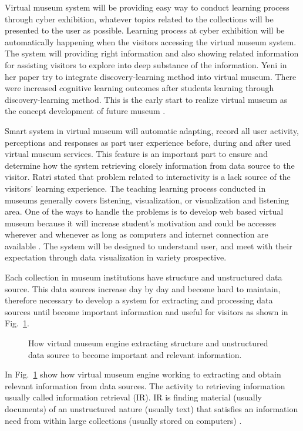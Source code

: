 Virtual museum system will be providing easy way to conduct learning process through cyber exhibition, whatever topics related to the collections will be presented to the user as possible. Learning process at cyber exhibition will be automatically happening when the visitors accessing the virtual museum system. The system will providing right information and also showing related information for assisting visitors to explore into deep substance of the information. Yeni in her paper try to integrate discovery-learning method into virtual museum. There were increased cognitive learning outcomes after students learning through discovery-learning method. This is the early start to realize virtual museum as the concept development of future museum \cite{Nurhasanah}.

Smart system in virtual museum will automatic adapting, record all user activity, perceptions and responses as part user experience before, during and after used virtual museum services. This feature is an important part to ensure and determine how the system retrieving closely information from data source to the visitor. Ratri stated that problem related to interactivity is a lack source of the visitors' learning experience. The teaching learning process conducted in museums generally covers listening, visualization, or visualization and listening area. One of the ways to handle the problems is to develop web based virtual museum because it will increase student’s motivation and could be accesses wherever and whenever as long as computers and internet connection are available \cite{Kayungyun}. The system will be designed to understand user, and meet with their expectation through data visualization in variety prospective.

Each collection in museum institutions have structure and unstructured data source. This data sources increase day by day and become hard to maintain, therefore necessary to develop a system for extracting and processing data sources until become important information and useful for visitors as shown in Fig.~\cref{fig:virtualMuseumEngine}.

\begin{figure}[ht]
	\caption{How virtual museum engine extracting structure and unstructured data source to become important and relevant information.}\label{fig:virtualMuseumEngine}
\end{figure}

In Fig.~\cref{fig:virtualMuseumEngine} show how virtual museum engine working to extracting and obtain relevant information from data sources. The activity to retrieving information usually called information retrieval (IR). IR is finding material (usually documents) of an unstructured nature (usually text) that satisfies an information need from within large collections (usually stored on computers) \cite{ManningRaghavanSchutze}.

